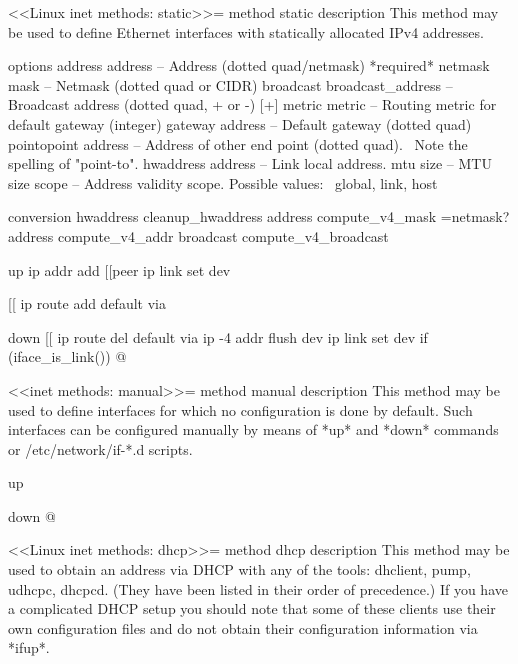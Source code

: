 \documentclass{article}
\begin{document}
<<Linux inet methods: static>>=
method static
  description
    This method may be used to define Ethernet interfaces with statically
    allocated IPv4 addresses.
      
  options
    address address             -- Address (dotted quad/netmask) *required*
    netmask mask                -- Netmask (dotted quad or CIDR)
    broadcast broadcast_address -- Broadcast address (dotted quad, + or -) [+]
    metric metric               -- Routing metric for default gateway (integer)
    gateway address             -- Default gateway (dotted quad)
    pointopoint address         -- Address of other end point (dotted quad). \
                                   Note the spelling of "point-to".
    hwaddress address           -- Link local address.
    mtu size                    -- MTU size
    scope                       -- Address validity scope. Possible values: \
                                   global, link, host

  conversion
    hwaddress cleanup_hwaddress
    address compute_v4_mask =netmask?
    address compute_v4_addr
    broadcast compute_v4_broadcast

  up
    ip addr add %
	[[peer %
    ip link set dev %

    [[ ip route add default via %

  down
    [[ ip route del default via %
    ip -4 addr flush dev %
    ip link set dev %
		if (iface_is_link())
@

<<inet methods: manual>>=
method manual
  description
    This method may be used to define interfaces for which no configuration
    is done by default.  Such interfaces can be configured manually by
    means of *up* and *down* commands or /etc/network/if-*.d scripts.

  up

  down
@ 

<<Linux inet methods: dhcp>>=
method dhcp
  description
    This method may be used to obtain an address via DHCP with any of
    the tools: dhclient, pump, udhcpc, dhcpcd.
    (They have been listed in their order of precedence.)
    If you have a complicated DHCP setup you should
    note that some of these clients use their own configuration files
    and do not obtain their configuration information via *ifup*.
\end{document}
